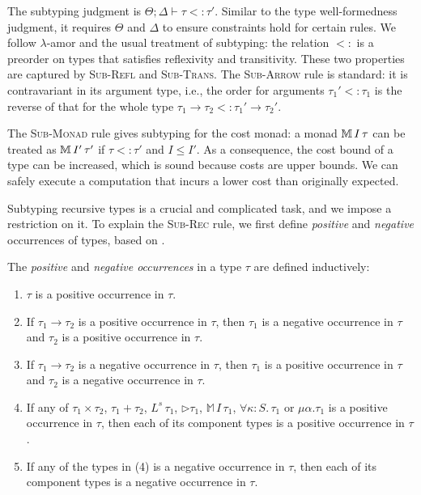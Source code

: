 The subtyping judgment is $\Theta;\Delta\vdash\tau<:\tau'$. Similar to the type well-formedness judgment, it requires $\Theta$ and $\Delta$ to ensure constraints hold for certain rules. 
We follow $\lambda$-amor and the usual treatment of subtyping: the relation $<:$ is a preorder on types that satisfies reflexivity and transitivity. These two 
properties are captured by \textsc{Sub-Refl} and \textsc{Sub-Trans}. The \textsc{Sub-Arrow} rule is standard: it is contravariant in its argument type, i.e.,
the order for arguments $\tau_1' <: \tau_1$ is the reverse of that for the whole type $\tau_1 \to \tau_2 <: \tau_1' \to \tau_2'$.

The \textsc{Sub-Monad} rule gives subtyping for the cost monad: a monad $\mathbb{M}\,{I}\, \tau$ can be treated as 
$\mathbb{M}\,{I'}\, \tau'$ if $\tau <: \tau'$ and $I \leq I'$. As a consequence, the cost bound of a type can be increased, which is sound because costs are upper bounds. We can safely execute a computation that incurs a lower cost than originally expected.

Subtyping recursive types is a crucial and complicated task, and we impose a restriction on it. 
To explain the \textsc{Sub-Rec} rule, we first define \emph{positive} and \emph{negative} occurrences of types, based on \cite{pierce02}.

\begin{defn}
\label{def:polarity}
The \emph{positive} and \emph{negative occurrences} in a type $\tau$
are defined inductively:
\begin{enumerate}
  \item $\tau$ is a positive occurrence in $\tau$.
  \item If $\tau_1 \to \tau_2$ is a positive occurrence in $\tau$, then
        $\tau_1$ is a negative occurrence in $\tau$ and $\tau_2$ is a
        positive occurrence in $\tau$.
  \item If $\tau_1 \to \tau_2$ is a negative occurrence in $\tau$, then
        $\tau_1$ is a positive occurrence in $\tau$ and $\tau_2$ is a
        negative occurrence in $\tau$.
  \item If any of $\tau_1 \times \tau_2$, $\tau_1 + \tau_2$,
        $L^s\,\tau_1$, $\triangleright\tau_1$, $\mathbb{M}\,I\,\tau_1$,
        $\forall\kappa{:}S.\,\tau_1$ or $\mu\alpha.\tau_1$ is a
        positive occurrence in $\tau$, then each of its
        component types is a positive occurrence in $\tau$.
  \item If any of the types in (4) is a negative occurrence in $\tau$,
        then each of its component types is a negative occurrence
        in $\tau$.
\end{enumerate}
\end{defn}

